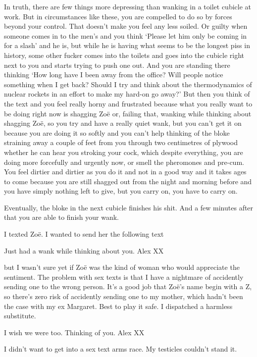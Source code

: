 In truth, there are few things more depressing than wanking in a
toilet cubicle at work. But in circumstances like these, you are
compelled to do so by forces beyond your control. That doesn't make
you feel any less soiled. Or guilty when someone comes in to the
men's and you think `Please let him only be coming in for a slash'
and he is, but while he is having what seems to be the longest piss
in history, some other fucker comes into the toilets and goes into
the cubicle right next to you and starts trying to push one out. And
you are standing there thinking `How long have I been away from the
office? Will people notice something when I get back? Should I try
and think about the thermodynamics of nuclear rockets in an effort
to make my hard-on go away?' But then you think of the text and you
feel really horny and frustrated because what you really want to be
doing right now is shagging Zoë or, failing that, wanking while
thinking about shagging Zoë, so you try and have a really
{\twelveit quiet\/} wank, but you can't get it on because you are
doing it so softly and you can't help thinking of the bloke
straining away a couple of feet from you through two centimetres
of plywood whether he can hear you stroking your cock, which despite
everything, you are doing more forcefully and urgently now, or smell
the pheromones and pre-cum. You feel dirtier and dirtier as you do it
and not in a good way and it takes ages to come because you are
still shagged out from the night and morning before and you have
simply nothing left to give, but you carry on, you have to carry on.

Eventually, the bloke in the next cubicle finishes his shit. And a
few minutes after that you are able to finish your wank.

I texted Zoë. I wanted to send her the following text

\startmessage
Just had a wank while thinking about you. Alex XX
\stopmessage

but I wasn't sure yet if Zoë was the kind of woman who would
appreciate the sentiment. The problem with sex texts is that I have
a nightmare of accidently sending one to the wrong person. It's a
good job that Zoë's name begin with a Z, so there's zero risk of
accidently sending one to my mother, which hadn't been the case with
my ex Margaret. Best to play it safe. I dispatched a harmless
substitute.

\startmessage
I wish we were too. Thinking of you. Alex XX
\stopmessage

I didn't want to get into a sex text arms race. My testicles
couldn't stand it.

